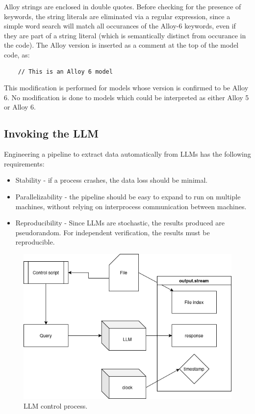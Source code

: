 \documentclass[conference]{IEEEtran}
\begin{document}
Alloy strings are enclosed in double quotes. Before checking for the presence of keywords, the string literals are eliminated via a regular expression, since a simple word search will match all occurances of the Alloy-6 keywords, even if they are part of a string literal (which is semantically distinct from occurance in the code). The Alloy version is inserted as a comment at the top of the model code, as:

\begin{lstlisting}
    // This is an Alloy 6 model
\end{lstlisting}

This modification is performed for models whose version is confirmed to be Alloy 6. No modification is done to models which could be interpreted as either Alloy 5 or Alloy 6.

\subsection{Invoking the LLM}

Engineering a pipeline to extract data automatically from LLMs has the following requirements:

\begin{itemize}
    \item Stability - if a process crashes, the data loss should be minimal.
    \item Parallelizability - the pipeline should be easy to expand to run on multiple machines, without relying on interprocess communication between machines.
    \item Reproducibility - Since LLMs are stochastic, the results produced are pseudorandom. For independent verification, the results must be reproducible.
\end{itemize}

\begin{figure}[htbp]
    \centerline{\includegraphics[width=\linewidth]{"./images/process.png"}}
    \caption{LLM control process.}
    \label{fig}
    \end{figure}
\end{document}
